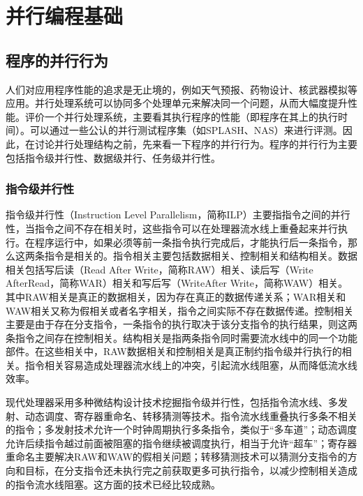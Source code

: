 \documentclass[]{ctexbook}
\begin{document}
\hypertarget{ux5e76ux884cux7f16ux7a0bux57faux7840}{%
\chapter{并行编程基础}\label{ux5e76ux884cux7f16ux7a0bux57faux7840}}

\hypertarget{ux7a0bux5e8fux7684ux5e76ux884cux884cux4e3a}{%
\section{程序的并行行为}\label{ux7a0bux5e8fux7684ux5e76ux884cux884cux4e3a}}

人们对应用程序性能的追求是无止境的，例如天气预报、药物设计、核武器模拟等应用。并行处理系统可以协同多个处理单元来解决同一个问题，从而大幅度提升性能。评价一个并行处理系统，主要看其执行程序的性能（即程序在其上的执行时间）。可以通过一些公认的并行测试程序集（如SPLASH、NAS）来进行评测。因此，在讨论并行处理结构之前，先来看一下程序的并行行为。程序的并行行为主要包括指令级并行性、数据级并行、任务级并行性。

\hypertarget{ux6307ux4ee4ux7ea7ux5e76ux884cux6027}{%
\subsection{指令级并行性}\label{ux6307ux4ee4ux7ea7ux5e76ux884cux6027}}

指令级并行性（Instruction Level Parallelism，简称ILP）主要指指令之间的并行性，当指令之间不存在相关时，这些指令可以在处理器流水线上重叠起来并行执行。在程序运行中，如果必须等前一条指令执行完成后，才能执行后一条指令，那么这两条指令是相关的。指令相关主要包括数据相关、控制相关和结构相关。数据相关包括写后读（Read After Write，简称RAW）相关、读后写（Write AfterRead，简称WAR）相关和写后写（WriteAfter Write，简称WAW）相关。其中RAW相关是真正的数据相关，因为存在真正的数据传递关系；WAR相关和WAW相关又称为假相关或者名字相关，指令之间实际不存在数据传递。控制相关主要是由于存在分支指令，一条指令的执行取决于该分支指令的执行结果，则这两条指令之间存在控制相关。结构相关是指两条指令同时需要流水线中的同一个功能部件。在这些相关中，RAW数据相关和控制相关是真正制约指令级并行执行的相关。指令相关容易造成处理器流水线上的冲突，引起流水线阻塞，从而降低流水线效率。

现代处理器采用多种微结构设计技术挖掘指令级并行性，包括指令流水线、多发射、动态调度、寄存器重命名、转移猜测等技术。指令流水线重叠执行多条不相关的指令；多发射技术允许一个时钟周期执行多条指令，类似于``多车道''；动态调度允许后续指令越过前面被阻塞的指令继续被调度执行，相当于允许``超车''；寄存器重命名主要解决RAW和WAW的假相关问题；转移猜测技术可以猜测分支指令的方向和目标，在分支指令还未执行完之前获取更多可执行指令，以减少控制相关造成的指令流水线阻塞。这方面的技术已经比较成熟。
\end{document}
